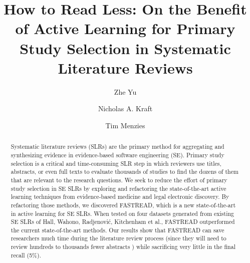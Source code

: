 \documentclass{svjour3}
\theoremstyle{break}
\begin{document}
\title{How to Read Less: On the Benefit of Active Learning for Primary Study Selection in Systematic Literature Reviews%
}



\author{Zhe Yu         \and
        Nicholas A. Kraft \and 
        Tim Menzies%
}




\maketitle

\begin{abstract}
  
Systematic literature reviews (SLRs) are the primary method for aggregating and synthesizing evidence in evidence-based software engineering (SE). Primary study selection is a critical and time-consuming SLR step in which reviewers use
titles, abstracts, or even full texts to evaluate thousands of studies to find the dozens of them that are relevant to the research questions. We seek to reduce the effort of primary study selection in SE SLRs by exploring and refactoring the state-of-the-art active learning techniques from evidence-based medicine and legal electronic discovery. By refactoring those methods, we discovered FASTREAD, which is a new state-of-the-art in active learning for SE SLRs. When tested on four datasets generated from existing SE SLRs of Hall, Wahono, Radjenovi{\'c}, Kitchenham et al., FASTREAD outperformed the current state-of-the-art methods. Our results show that FASTREAD can save researchers much time during
 the literature review process (since they will need to review hundreds to thousands fewer abstracts ) 
 while sacrificing very little
in the final recall  (5\%).


\end{abstract}
\end{document}
